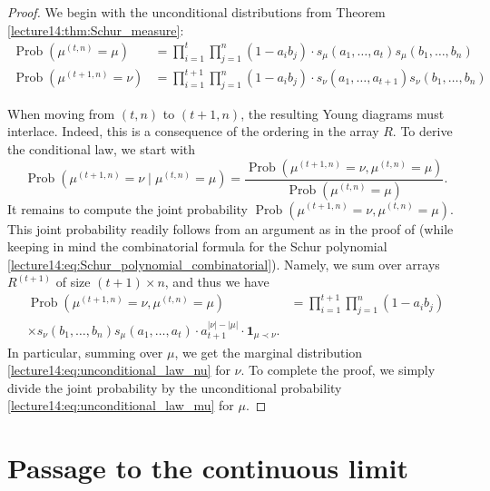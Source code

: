 \documentclass[letterpaper,11pt,oneside,reqno]{book}
\numberwithin{equation}{chapter}  %
\theoremstyle{definition}
\begin{document}
\begin{proof}
	We begin with the unconditional distributions from Theorem \ref{lecture14:thm:Schur_measure}:
	\begin{align}
		\label{lecture14:eq:unconditional_law_mu}
	\operatorname{Prob}\left( \mu^{(t,n)} = \mu \right) &= \prod_{i=1}^t\prod_{j=1}^n (1-a_i b_j)\cdot s_\mu(a_1,\ldots,a_t)s_\mu(b_1,\ldots,b_n) \\
	\label{lecture14:eq:unconditional_law_nu}
	\operatorname{Prob}\left( \mu^{(t+1,n)} = \nu \right) &= \prod_{i=1}^{t+1}\prod_{j=1}^n (1-a_i b_j)\cdot s_\nu(a_1,\ldots,a_{t+1})s_\nu(b_1,\ldots,b_n)
	\end{align}

	When moving from $(t,n)$ to $(t+1,n)$, the resulting Young diagrams must interlace.
	Indeed, this is a consequence of the ordering in the array $R$.
	To derive the conditional law, we start with
	\begin{equation*}
		\operatorname{Prob}\left( \mu^{(t+1,n)} = \nu \mid \mu^{(t,n)} = \mu \right) = \frac{\operatorname{Prob}\left( \mu^{(t+1,n)} = \nu, \mu^{(t,n)} = \mu \right)}{\operatorname{Prob}\left( \mu^{(t,n)} = \mu \right)}.
	\end{equation*}
	It remains to compute the joint probability $\operatorname{Prob}\left( \mu^{(t+1,n)} = \nu, \mu^{(t,n)} = \mu \right)$.
	This joint probability readily follows from
	an argument as in the proof of  (while keeping in mind the combinatorial
	formula for the Schur polynomial \eqref{lecture14:eq:Schur_polynomial_combinatorial}).
	Namely, we sum over arrays $R^{(t+1)}$ of size $(t+1)\times n$,
	and thus we have
	\begin{equation*}
		\begin{split}
		\operatorname{Prob}\left( \mu^{(t+1,n)} = \nu, \mu^{(t,n)} = \mu \right) &=
		\prod_{i=1}^{t+1}\prod_{j=1}^n (1-a_i b_j)
		\\\times
		s_\nu(b_1,\ldots,b_n)
		s_\mu(a_1,\ldots,a_{t})
		\cdot a_{t+1}^{|\nu|-|\mu|} \cdot \mathbf{1}_{\mu \prec \nu}.
		\end{split}
	\end{equation*}
	In particular, summing over $\mu$, we get the marginal distribution
	\eqref{lecture14:eq:unconditional_law_nu} for $\nu$.
	To complete the proof, we simply divide the joint probability by the unconditional probability
	\eqref{lecture14:eq:unconditional_law_mu} for $\mu$.
\end{proof}

\section{Passage to the continuous limit}
\label{lecture14:sec:passage_to_continuous_limit}
\end{document}
